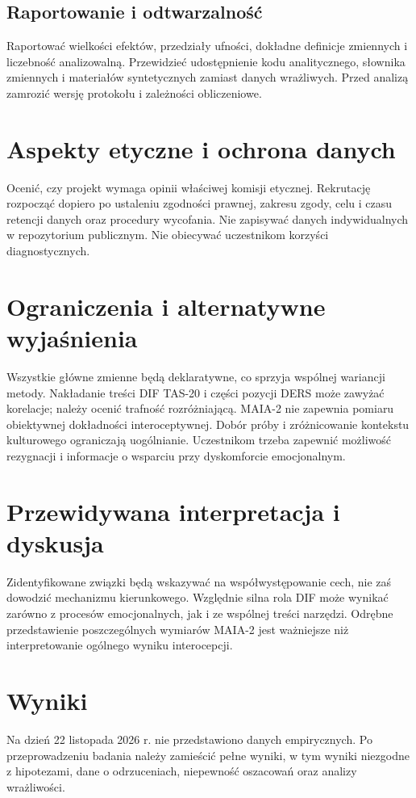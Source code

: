 \documentclass[11pt,a4paper]{article}
\begin{document}
\subsection{Raportowanie i odtwarzalność}
Raportować wielkości efektów, przedziały ufności, dokładne definicje zmiennych i liczebność analizowalną. Przewidzieć udostępnienie kodu analitycznego, słownika zmiennych i materiałów syntetycznych zamiast danych wrażliwych. Przed analizą zamrozić wersję protokołu i zależności obliczeniowe.
\section{Aspekty etyczne i ochrona danych}
Ocenić, czy projekt wymaga opinii właściwej komisji etycznej. Rekrutację rozpocząć dopiero po ustaleniu zgodności prawnej, zakresu zgody, celu i czasu retencji danych oraz procedury wycofania. Nie zapisywać danych indywidualnych w repozytorium publicznym. Nie obiecywać uczestnikom korzyści diagnostycznych.
\section{Ograniczenia i alternatywne wyjaśnienia}
Wszystkie główne zmienne będą deklaratywne, co sprzyja wspólnej wariancji metody. Nakładanie treści DIF TAS-20 i części pozycji DERS może zawyżać korelacje; należy ocenić trafność rozróżniającą. MAIA-2 nie zapewnia pomiaru obiektywnej dokładności interoceptywnej. Dobór próby i zróżnicowanie kontekstu kulturowego ograniczają uogólnianie. Uczestnikom trzeba zapewnić możliwość rezygnacji i informacje o wsparciu przy dyskomforcie emocjonalnym.
\section{Przewidywana interpretacja i dyskusja}
Zidentyfikowane związki będą wskazywać na współwystępowanie cech, nie zaś dowodzić mechanizmu kierunkowego. Względnie silna rola DIF może wynikać zarówno z procesów emocjonalnych, jak i ze wspólnej treści narzędzi. Odrębne przedstawienie poszczególnych wymiarów MAIA-2 jest ważniejsze niż interpretowanie ogólnego wyniku interocepcji.
\section{Wyniki}
Na dzień 22 listopada 2026 r. nie przedstawiono danych empirycznych. Po przeprowadzeniu badania należy zamieścić pełne wyniki, w tym wyniki niezgodne z hipotezami, dane o odrzuceniach, niepewność oszacowań oraz analizy wrażliwości.
\end{document}
